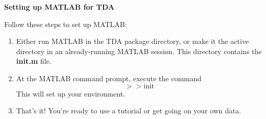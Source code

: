 \documentclass[12pt,twoside]{article}
\begin{document}
\begin{center}
{\large\textbf{Setting up MATLAB for TDA}}   
\end{center}

Follow these steps to set up MATLAB:

\begin{enumerate}
   \item Either run MATLAB in the TDA package directory, or make it the active directory in an already-running MATLAB session.  This directory contains the \textbf{init.m} file.\\
   \item At the MATLAB command prompt, execute the command $$>> \mbox{init}$$  This will set up your environment.\\
   \item That's it!  You're ready to use a tutorial or get going on your own data.
\end{enumerate}


\label{LastPage}
\end{document}
